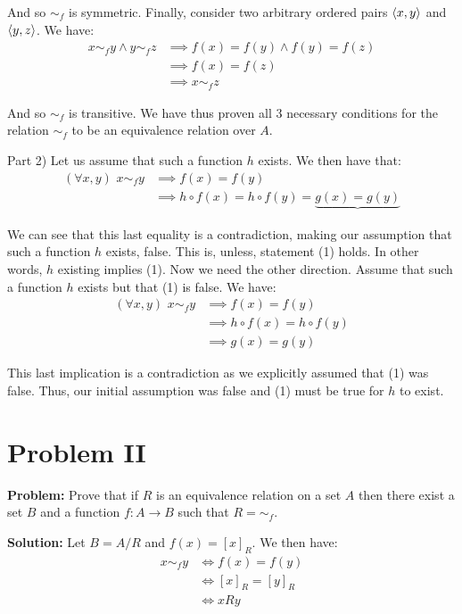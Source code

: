\documentclass{article}
\begin{document}
And so $\sim_f$ is symmetric. Finally, consider two arbitrary ordered pairs $\langle x,y\rangle$ and $\langle y,z\rangle$. We have:
\begin{align*}
    x\sim_fy\wedge y\sim_fz&\implies f(x)=f(y)\wedge f(y)=f(z)\tag{def. of $\sim_f$}\\
    &\implies f(x)=f(z)\tag{transitivity of equality}\\
    &\implies x\sim_fz\tag{def. of $\sim_f$}
\end{align*}

And so $\sim_f$ is transitive. We have thus proven all 3 necessary conditions for the relation $\sim_f$ to be an equivalence relation over $A$.
\smallskip

Part 2) Let us assume that such a function $h$ exists. We then have that:
\begin{align*}
    (\forall x,y)\,\,x\sim_fy&\implies f(x)=f(y)\\
    &\implies h\circ f(x)=h\circ f(y)=\underbrace{g(x)=g(y)}
\end{align*}

We can see that this last equality is a contradiction, making our assumption that such a function $h$ exists, false. This is, unless, statement (1) holds. In other words, $h$ existing implies (1). Now we need the other direction. Assume that such a function $h$ exists but that (1) is false. We have:
\begin{align*}
    (\forall x,y)\,\,x\sim_fy&\implies f(x)=f(y)\\
    &\implies h\circ f(x)=h\circ f(y)\\
    &\implies g(x)=g(y)\tag{def. of $h\circ f$}
\end{align*}

This last implication is a contradiction as we explicitly assumed that (1) was false. Thus, our initial assumption was false and (1) must be true for $h$ to exist.

\section*{Problem II}
\noindent\textbf{Problem:} Prove that if $R$ is an equivalence relation on a set $A$ then there exist a set $B$ and a function $f:A\to B$ such that $R =\sim_f$.
\bigskip

\noindent\textbf{Solution:} Let $B=A/R$ and $f(x)=[x]_R$. We then have:
\begin{align*}
    x\sim_fy&\iff f(x)=f(y)\\
    &\iff[x]_R=[y]_R\\
    &\iff xRy\tag{def. of equivalence class}
\end{align*}
\end{document}
